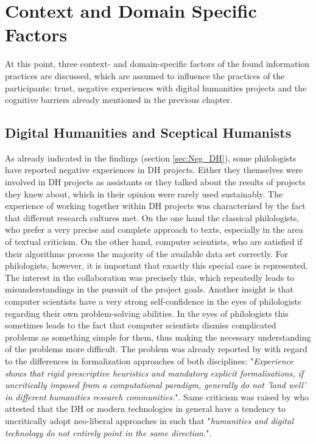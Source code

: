 \documentclass[12pt, a4paper, titlepage, oneside, abstract=true, toc=listof, toc=bibliography, BCOR=1cm]{scrreprt}
\begin{document}
{\section{Context and Domain Specific Factors}
\label{sec:Disc_Context}
At this point, three context- and domain-specific \citep{Hjorland2002a} factors of the found information practices are discussed, which are assumed to influence the practices of the participants: trust, negative experiences with digital humanities projects and the cognitive barriers already mentioned in the previous chapter.

\subsection*{Digital Humanities and Sceptical Humanists}
As already indicated in the findings (section \ref{sec:Neg_DH}), some philologists have reported negative experiences in DH projects. Either they themselves were involved in DH projects as assistants or they talked about the results of projects they knew about, which in their opinion were rarely used sustainably. The experience of working together within DH projects was characterized by the fact that different research cultures met. On the one hand the classical philologists, who prefer a very precise and complete approach to texts, especially in the area of textual criticism. On the other hand, computer scientists, who are satisfied if their algorithms process the majority of the available data set correctly. For philologists, however, it is important that exactly this special case is represented. The interest in the collaboration was precisely this, which repeatedly leads to misunderstandings in the pursuit of the project goals. Another insight is that computer scientists have a very strong self-confidence in the eyes of philologists regarding their own problem-solving abilities. In the eyes of philologists this sometimes leads to the fact that computer scientists dismiss complicated problems as something simple for them, thus making the necessary understanding of the problems more difficult. The problem was already reported by \citep[p. 279f]{VanZundert2012} with regard to the differences in formalization approaches of both disciplines: "\textit{Experience shows that rigid prescriptive heuristics and mandatory explicit formalisations, if uncritically imposed from a computational paradigm, generally do not 'land well' in different humanities research communities.}". Same criticism was raised by \citet[p. 198]{Barker2012} who attested that the DH or modern technologies in general have a tendency to uncritically adopt neo-liberal approaches in such that "\textit{humanities and digital technology do not entirely point in the same direction.}". 

}
\end{document}
